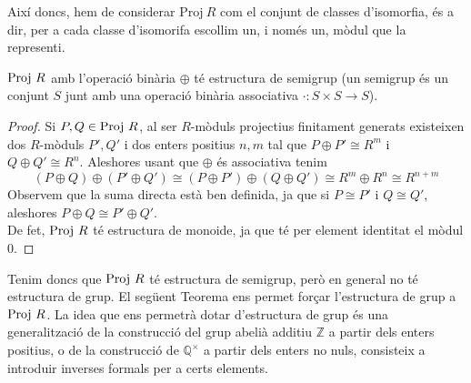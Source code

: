 Així doncs, hem de considerar $\text{Proj} \ R$ com el conjunt de classes d'isomorfia, és a dir, per a cada classe d'isomorifa escollim un, i només un, mòdul que la representi.


\begin{prop}
 $\mathrm{Proj} \  R$ amb l'operació binària $\oplus$ té estructura de semigrup (un semigrup és un conjunt $S$ junt amb una operació binària associativa $\cdot: S \times S \rightarrow S$). 
\end{prop}
\begin{proof}
Si $P,Q \in \mathrm{Proj} \  R$, al ser $R$-mòduls projectius finitament generats existeixen dos $R$-mòduls $P',Q'$ i dos enters positius $n,m$ tal que $P\oplus P' \cong R^m$ i $Q \oplus Q' \cong R^n$. Aleshores usant que $\oplus$ és associativa tenim
$$
(P\oplus Q) \oplus (P' \oplus Q') \cong (P \oplus P') \oplus (Q \oplus Q') \cong R^m \oplus R^n \cong R^{n+m}
$$
Observem que la suma directa està ben definida, ja que si $P\cong P'$ i $Q\cong Q'$, aleshores $P\oplus Q \cong P' \oplus Q'$. \\
De fet, $\mathrm{Proj} \  R$ té estructura de monoide, ja que té per element identitat el mòdul $0$. 
\end{proof}
Tenim doncs que $\mathrm{Proj} \  R$ té estructura de semigrup, però en general no té estructura de grup. El següent Teorema ens permet forçar l'estructura de grup a $\mathrm{Proj} \  R$. La idea que ens permetrà dotar d'estructura de grup és una generalització de la construcció del grup abelià additiu $\mathbb{Z}$ a partir dels enters positius, o de la construcció de $\mathbb{Q}^\times$ a partir dels enters no nuls, consisteix a introduir inverses formals per a certs elements.

